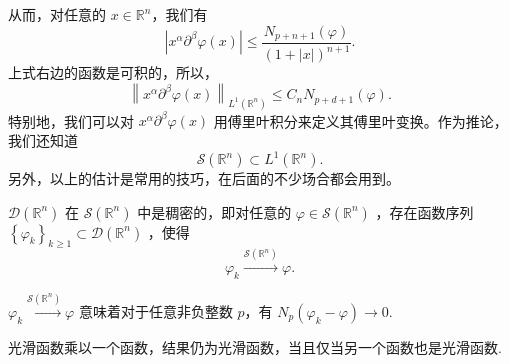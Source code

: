 从而，对任意的 $x \in \mathbb{R}^n$，我们有
\[
\left|x^\alpha \partial^\beta \varphi(x)\right| \leqslant \frac{N_{p+n+1}(\varphi)}{(1+|x|)^{n+1}} .
\]
上式右边的函数是可积的，所以，
\[
\left\|x^\alpha \partial^\beta \varphi(x)\right\|_{L^1\left(\mathbb{R}^n\right)} \leqslant C_n N_{p+d+1}(\varphi) .
\]
特别地，我们可以对 $x^\alpha \partial^\beta \varphi(x)$ 用傅里叶积分来定义其傅里叶变换。作为推论，我们还知道
\[
\mathcal{S}\left(\mathbb{R}^n\right) \subset L^1\left(\mathbb{R}^n\right) .
\]
另外，以上的估计是常用的技巧，在后面的不少场合都会用到。

\begin{theorem}
$\mathcal{D}\left(\mathbb{R}^n\right)$ 在 $\mathcal{S}\left(\mathbb{R}^n\right)$ 中是稠密的，即对任意的 $\varphi \in \mathcal{S}\left(\mathbb{R}^n\right)$ ，存在函数序列 $\left\{\varphi_k\right\}_{k \geqslant 1} \subset \mathcal{D}\left(\mathbb{R}^n\right)$ ，使得
\[
\varphi_k \xrightarrow{\mathcal{S}\left(\mathbb{R}^n\right)} \varphi .
\]
\end{theorem}
\begin{note}
$\varphi _k\overset{ \mathcal{S}(\mathbb{R}^{n}) }{ \to }\varphi$ 意味着对于任意非负整数 $p$，有 $N_{p}(\varphi _k-\varphi)\to0$.
\end{note}
\begin{note}
光滑函数乘以一个函数，结果仍为光滑函数，当且仅当另一个函数也是光滑函数.
\end{note}
